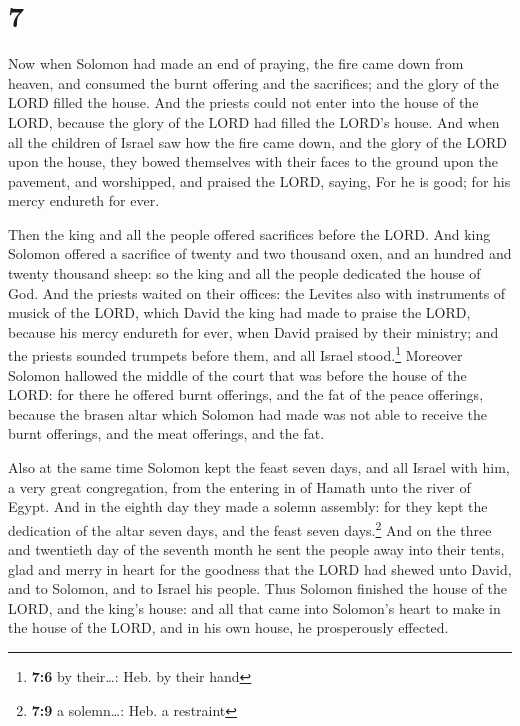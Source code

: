 \hypertarget{section-6}{%
\section{7}\label{section-6}}

 Now when Solomon had made an end of praying, the fire
came down from heaven, and consumed the burnt offering and the
sacrifices; and the glory of the LORD filled the house. 
And the priests could not enter into the house of the LORD, because the
glory of the LORD had filled the LORD's house.  And when
all the children of Israel saw how the fire came down, and the glory of
the LORD upon the house, they bowed themselves with their faces to the
ground upon the pavement, and worshipped, and praised the LORD, saying,
For he is good; for his mercy endureth for ever.

 Then the king and all the people offered sacrifices
before the LORD.  And king Solomon offered a sacrifice of
twenty and two thousand oxen, and an hundred and twenty thousand sheep:
so the king and all the people dedicated the house of God.
 And the priests waited on their offices: the Levites also
with instruments of musick of the LORD, which David the king had made to
praise the LORD, because his mercy endureth for ever, when David praised
by their ministry; and the priests sounded trumpets before them, and all
Israel stood.\footnote{\textbf{7:6} by their\ldots: Heb. by their hand}
 Moreover Solomon hallowed the middle of the court that
was before the house of the LORD: for there he offered burnt offerings,
and the fat of the peace offerings, because the brasen altar which
Solomon had made was not able to receive the burnt offerings, and the
meat offerings, and the fat.

 Also at the same time Solomon kept the feast seven days,
and all Israel with him, a very great congregation, from the entering in
of Hamath unto the river of Egypt.  And in the eighth day
they made a solemn assembly: for they kept the dedication of the altar
seven days, and the feast seven days.\footnote{\textbf{7:9} a
  solemn\ldots: Heb. a restraint}  And on the three and
twentieth day of the seventh month he sent the people away into their
tents, glad and merry in heart for the goodness that the LORD had shewed
unto David, and to Solomon, and to Israel his people. 
Thus Solomon finished the house of the LORD, and the king's house: and
all that came into Solomon's heart to make in the house of the LORD, and
in his own house, he prosperously effected.

